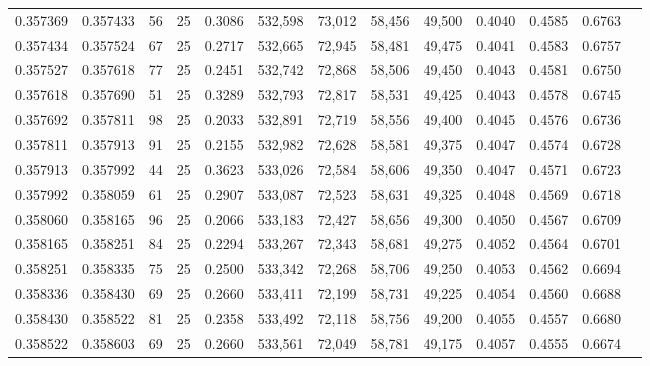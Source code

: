 \begin{tabular}{rrrrrrrrrrrrr}
0.357369 & 0.357433 &    56 &  25 &                                     0.3086 & 532,598 &  73,012 &  58,456 &  49,500 & 0.4040 & 0.4585 & 0.6763 \\
0.357434 & 0.357524 &    67 &  25 &                                     0.2717 & 532,665 &  72,945 &  58,481 &  49,475 & 0.4041 & 0.4583 & 0.6757 \\
0.357527 & 0.357618 &    77 &  25 &                                     0.2451 & 532,742 &  72,868 &  58,506 &  49,450 & 0.4043 & 0.4581 & 0.6750 \\
0.357618 & 0.357690 &    51 &  25 &                                     0.3289 & 532,793 &  72,817 &  58,531 &  49,425 & 0.4043 & 0.4578 & 0.6745 \\
0.357692 & 0.357811 &    98 &  25 &                                     0.2033 & 532,891 &  72,719 &  58,556 &  49,400 & 0.4045 & 0.4576 & 0.6736 \\
0.357811 & 0.357913 &    91 &  25 &                                     0.2155 & 532,982 &  72,628 &  58,581 &  49,375 & 0.4047 & 0.4574 & 0.6728 \\
0.357913 & 0.357992 &    44 &  25 &                                     0.3623 & 533,026 &  72,584 &  58,606 &  49,350 & 0.4047 & 0.4571 & 0.6723 \\
0.357992 & 0.358059 &    61 &  25 &                                     0.2907 & 533,087 &  72,523 &  58,631 &  49,325 & 0.4048 & 0.4569 & 0.6718 \\
0.358060 & 0.358165 &    96 &  25 &                                     0.2066 & 533,183 &  72,427 &  58,656 &  49,300 & 0.4050 & 0.4567 & 0.6709 \\
0.358165 & 0.358251 &    84 &  25 &                                     0.2294 & 533,267 &  72,343 &  58,681 &  49,275 & 0.4052 & 0.4564 & 0.6701 \\
0.358251 & 0.358335 &    75 &  25 &                                     0.2500 & 533,342 &  72,268 &  58,706 &  49,250 & 0.4053 & 0.4562 & 0.6694 \\
0.358336 & 0.358430 &    69 &  25 &                                     0.2660 & 533,411 &  72,199 &  58,731 &  49,225 & 0.4054 & 0.4560 & 0.6688 \\
0.358430 & 0.358522 &    81 &  25 &                                     0.2358 & 533,492 &  72,118 &  58,756 &  49,200 & 0.4055 & 0.4557 & 0.6680 \\
0.358522 & 0.358603 &    69 &  25 &                                     0.2660 & 533,561 &  72,049 &  58,781 &  49,175 & 0.4057 & 0.4555 & 0.6674 \\

\end{tabular}
